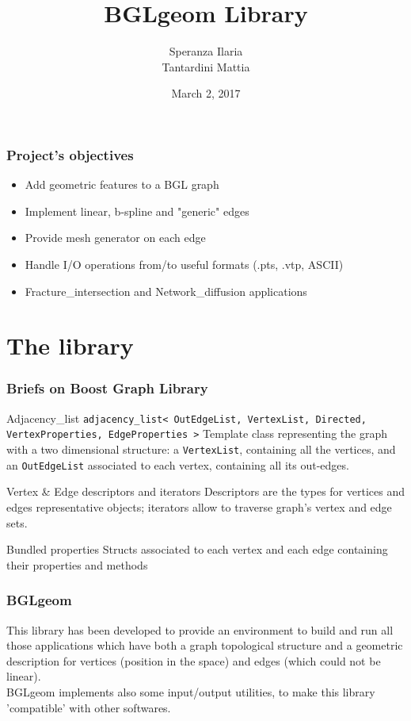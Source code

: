 \documentclass[11pt]{beamer}
\author{Speranza Ilaria \\ Tantardini Mattia}
\title{BGLgeom Library}
\institute{\textbf{Politecnico di Milano}}
\date{March 2, 2017}
\begin{document}
	\begin{frame}
		\maketitle
	\end{frame}
	
	\begin{frame}
		\frametitle{Project's objectives}
		\begin{itemize}
			\item Add geometric features to a BGL graph 
			\item Implement linear, b-spline and "generic" edges
			\item Provide mesh generator on each edge
			\item Handle I/O operations from/to useful formats (.pts, .vtp, ASCII) 
			\item Fracture\_intersection and Network\_diffusion applications 
		\end{itemize}
	\end{frame}
	
	\section{The library}
	\begin{frame}
		\frametitle{Briefs on Boost Graph Library}
		\begin{block}{Adjacency\_list}
			\texttt{adjacency\_list< OutEdgeList, VertexList, Directed, VertexProperties, EdgeProperties >} \newline
			Template class representing the graph with a two dimensional structure: 
			a \texttt{VertexList}, containing all the vertices, and an \texttt{OutEdgeList} associated to each vertex, containing all its out-edges.
		\end{block}
		
		\begin{block}{Vertex \& Edge descriptors and iterators}
			Descriptors are the types for vertices and edges representative objects; iterators allow to traverse graph's vertex and edge sets.
		\end{block}
		
		\begin{block}{Bundled properties}
			Structs associated to each vertex and each edge containing their properties and methods
		\end{block}	
	\end{frame}
	
	\begin{frame}
		\frametitle{BGLgeom}
		This library has been developed to provide an environment to build and run all those applications which have both a graph topological structure and a geometric description for vertices (position in the space) and edges (which could not be linear).\\
		BGLgeom implements also some input/output utilities, to make this library 'compatible' with other softwares.
	\end{frame}
	
\end{document}
